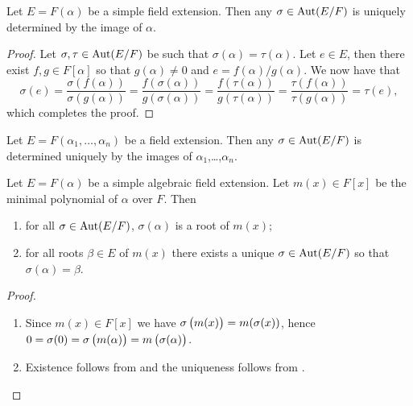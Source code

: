 \documentclass[11pt,a4paper]{article}
\begin{document}
\begin{lemma}
  \label{lem:simple-extension-unqiueness}
  Let $E = F(\alpha)$ be a simple field extension.
  Then any $\sigma \in \operatorname{Aut}(E/F)$ is uniquely determined by
  the image of $\alpha$.
\end{lemma}
\begin{proof}
  Let $\sigma,\tau \in \operatorname{Aut}(E/F)$ be such that $\sigma(\alpha) = \tau(\alpha)$.
  Let $e \in E$, then there exist $f,g \in F[\alpha]$ so that
  $g(\alpha) \neq 0$ and $e = f(\alpha) / g(\alpha)$.
  We now have that
  \[
    \sigma(e) =
    \frac{\sigma(f(\alpha))}{\sigma(g(\alpha))} =
    \frac{f(\sigma(\alpha))}{g(\sigma(\alpha))} =
    \frac{f(\tau(\alpha))}{g(\tau(\alpha))} =
    \frac{\tau(f(\alpha))}{\tau(g(\alpha))} =
    \tau(e),
  \]
  which completes the proof.
\end{proof}

\begin{exercise}
  Let $E = F(\alpha_1,\dots,\alpha_n)$ be a field extension.
  Then any $\sigma \in \operatorname{Aut}(E/F)$ is determined uniquely by
  the images of $\alpha_1$,\dots,$\alpha_{n}$.
\end{exercise}

\begin{lemma}
  \label{lem:galois-correspondence-intro}
  Let $E = F(\alpha)$ be a simple algebraic field extension.
  Let $m(x) \in F[x]$ be the minimal polynomial of $\alpha$ over $F$.
  Then
  \begin{enumerate}
    \item[(1)] for all $\sigma \in \operatorname{Aut}(E/F)$, $\sigma(\alpha)$ is a root
      of $m(x)$;
    \item[(2)] for all roots $\beta \in E$ of $m(x)$ there exists a unique
      $\sigma \in \operatorname{Aut}(E/F)$ so that $\sigma(\alpha) = \beta$.
  \end{enumerate}
\end{lemma}
\begin{proof} \phantom{}
  \begin{enumerate}
    \item[(1)] Since $m(x) \in F[x]$ we have $\sigma\del{m(x)} = m(\sigma(x))$,
      hence
      $0 = \sigma(0) = \sigma\del{m(\alpha)} = m\del{\sigma(\alpha)}$.
    \item[(2)] Existence follows from 
      and the uniqueness follows from .
  \end{enumerate}
\end{proof}
\end{document}
